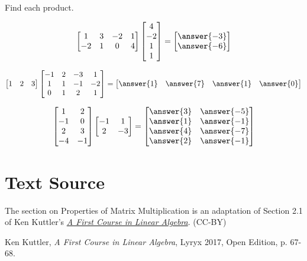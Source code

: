 \documentclass{ximera}
\begin{document}
\begin{problem}
Find each product.
\begin{problem}\label{prob:matprod1}
$$\begin{bmatrix}1&3&-2&1\\-2&1&0&4\end{bmatrix}\begin{bmatrix}4\\-2\\1\\1\end{bmatrix}=\begin{bmatrix}\answer{-3}\\\answer{-6}\end{bmatrix}$$
\end{problem}
\begin{problem}\label{prob:matprod2}
$$\begin{bmatrix}1&2&3\end{bmatrix}\begin{bmatrix}-1&2&-3&1\\1&1&-1&-2\\0&1&2&1\end{bmatrix}=\begin{bmatrix}\answer{1}&\answer{7}&\answer{1}&\answer{0}\end{bmatrix}$$
\end{problem}
\begin{problem}\label{prob:matprod3}
$$\begin{bmatrix}1&2\\-1&0\\2&3\\-4&-1\end{bmatrix}\begin{bmatrix}-1&1\\2&-3\end{bmatrix}=\begin{bmatrix}\answer{3}&\answer{-5}\\\answer{1}&\answer{-1}\\\answer{4}&\answer{-7}\\\answer{2}&\answer{-1}\end{bmatrix}
$$
\end{problem}
\end{problem}


\section*{Text Source}
The section on Properties of Matrix Multiplication is an adaptation of Section 2.1 of Ken Kuttler's \href{https://open.umn.edu/opentextbooks/textbooks/a-first-course-in-linear-algebra-2017}{\it A First Course in Linear Algebra}. (CC-BY)

Ken Kuttler, {\it  A First Course in Linear Algebra}, Lyryx 2017, Open Edition, p. 67-68.
\end{document}
